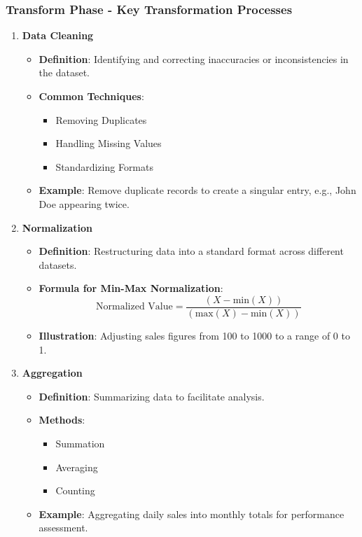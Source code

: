 \documentclass[aspectratio=169]{beamer}
\begin{document}
\begin{frame}[fragile]
    \frametitle{Transform Phase - Key Transformation Processes}
    \begin{enumerate}
        \item \textbf{Data Cleaning}
            \begin{itemize}
                \item \textbf{Definition}: Identifying and correcting inaccuracies or inconsistencies in the dataset.
                \item \textbf{Common Techniques}:
                    \begin{itemize}
                        \item Removing Duplicates
                        \item Handling Missing Values
                        \item Standardizing Formats
                    \end{itemize}
                \item \textbf{Example}: Remove duplicate records to create a singular entry, e.g., John Doe appearing twice.
            \end{itemize}
        \item \textbf{Normalization}
            \begin{itemize}
                \item \textbf{Definition}: Restructuring data into a standard format across different datasets.
                \item \textbf{Formula for Min-Max Normalization}:
                \begin{equation}
                \text{Normalized Value} = \frac{(X - \text{min}(X))}{(\text{max}(X) - \text{min}(X))}
                \end{equation}
                \item \textbf{Illustration}: Adjusting sales figures from 100 to 1000 to a range of 0 to 1.
            \end{itemize}
        \item \textbf{Aggregation}
            \begin{itemize}
                \item \textbf{Definition}: Summarizing data to facilitate analysis.
                \item \textbf{Methods}:
                    \begin{itemize}
                        \item Summation
                        \item Averaging
                        \item Counting
                    \end{itemize}
                \item \textbf{Example}: Aggregating daily sales into monthly totals for performance assessment.
            \end{itemize}
    \end{enumerate}
\end{frame}
\end{document}
